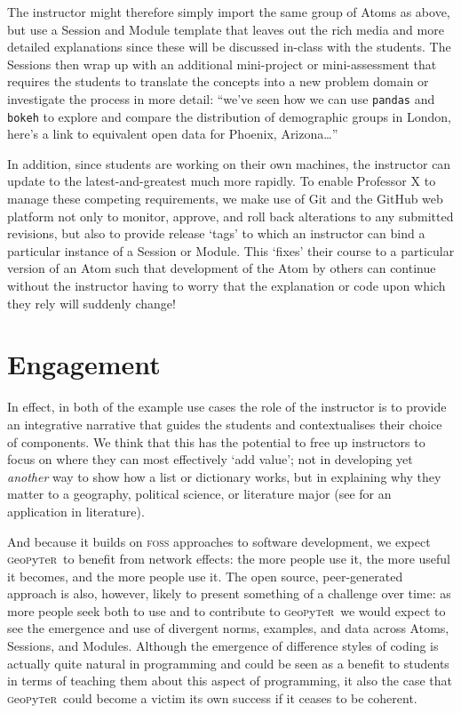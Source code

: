 \documentclass[letter, 11pt,titlepage]{article}
\newcommand{\gp}{\textsc{g}eo\textsc{p}y\textsc{t}e\textsc{r}~\/}
\begin{document}
The instructor might therefore simply import the same group of Atoms as above, but use a Session and Module template that leaves out the rich media and more detailed explanations since these will be discussed in-class with the students. The Sessions then wrap up with an additional mini-project or mini-assessment that requires the students to translate the concepts into a new problem domain or investigate the process in more detail: ``we've seen how we can use \texttt{pandas} and \texttt{bokeh} to explore and compare the distribution of demographic groups in London, here's a link to equivalent open data for Phoenix, Arizona\ldots{}'' 

In addition, since students are working on their own machines, the instructor can update to the latest-and-greatest much more rapidly. To enable Professor X to manage these competing requirements, we make use of Git and the GitHub web platform not only to monitor, approve, and roll back alterations to any submitted revisions, but also to provide release `tags' to which an instructor can bind a particular instance of a Session or Module. This `fixes' their course to a particular version of an Atom such that development of the Atom by others can continue without the instructor having to worry that the explanation or code upon which they rely will suddenly change! 

\section{Engagement}\label{sec:engagement}

In effect, in both of the example use cases the role of the instructor is to provide an integrative narrative that guides the students and contextualises their choice of components. We think that this has the potential to free up instructors to focus on where they can most effectively `add value'; not in developing yet \emph{another} way to show how a list or dictionary works, but in explaining why they matter to a geography, political science, or literature major (see \citealp{Bort2015} for an application in literature).

And because it builds on \textsc{foss} approaches to software development, we expect \gp to benefit from network effects: the more people use it, the more useful it becomes, and the more people use it. The open source, peer-generated approach is also, however, likely to present something of a challenge over time: as more people seek both to use and to contribute to \gp we would expect to see the emergence and use of divergent norms, examples, and data across Atoms, Sessions, and Modules. Although the emergence of difference styles of coding is actually quite natural in programming and could be seen as a benefit to students in terms of teaching them about this aspect of programming, it also the case that \gp could become a victim its own success if it ceases to be coherent.
\end{document}
